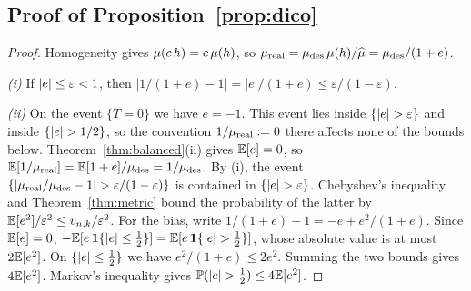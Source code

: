 \subsection{Proof of Proposition~\ref{prop:dico}}\label{app:supp-dico}

\begin{proof}
Homogeneity gives $\mu(c\,h)=c\,\mu(h)$, so
$\mu_{\mathrm{real}}=\mu_{\mathrm{des}}\,\mu(h)/\widehat{\mu}=\mu_{\mathrm{des}}/(1+e)$.

\emph{(i)} If $\lvert e\rvert\le\varepsilon<1$, then
$\lvert 1/(1+e)-1\rvert=\lvert e\rvert/(1+e)\le\varepsilon/(1-\varepsilon)$.

\emph{(ii)} On the event $\{T=0\}$ we have $e=-1$. This event lies inside
$\{\lvert e\rvert>\varepsilon\}$ and inside $\{\lvert e\rvert>1/2\}$, so the convention
$1/\mu_{\mathrm{real}}:=0$ there affects none of the bounds below.
Theorem~\ref{thm:balanced}(ii) gives $\mathbb{E}[e]=0$, so
$\mathbb{E}[1/\mu_{\mathrm{real}}]=\mathbb{E}[1+e]/\mu_{\mathrm{des}}=1/\mu_{\mathrm{des}}$. By (i), the event
$\{\lvert\mu_{\mathrm{real}}/\mu_{\mathrm{des}}-1\rvert>\varepsilon/(1-\varepsilon)\}$ is contained
in $\{\lvert e\rvert>\varepsilon\}$. Chebyshev's inequality and \mbox{Theorem}~\ref{thm:metric}
bound the probability of the latter by $\mathbb{E}[e^2]/\varepsilon^2\le v_{n,k}/\varepsilon^2$.
For the bias, write ${1/(1+e)-1=-e+e^2/(1+e)}$. Since $\mathbb{E}[e]=0$,
$-\mathbb{E}[e\,\mathbf{1}\{\lvert e\rvert\le\frac12\}]=\mathbb{E}[e\,\mathbf{1}\{\lvert e\rvert>\frac12\}]$, whose absolute value
is at most $2\mathbb{E}[e^2]$. On $\{\lvert e\rvert\le\frac12\}$ we have $e^2/(1+e)\le2e^2$.
Summing the two bounds gives $4\mathbb{E}[e^2]$. Markov's inequality gives
$\mathbb{P}(\lvert e\rvert>\frac12)\le4\mathbb{E}[e^2]$.
\end{proof}

